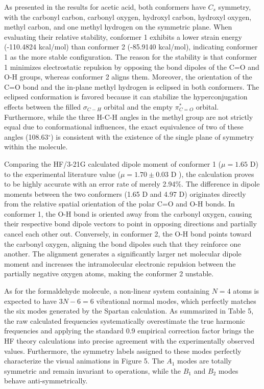 \documentclass[12pt]{article}
\begin{document}
As presented in the results for acetic acid, both conformers have $C_{s}$ symmetry, with the carbonyl carbon, carbonyl oxygen, hydroxyl carbon, hydroxyl oxygen, methyl carbon, and one methyl hydrogen on the symmetric plane. When evaluating their relative stability, conformer 1 exhibits a lower strain energy (-110.4824 kcal/mol) than conformer 2 (-85.9140 kcal/mol), indicating conformer 1 as the more stable configuration. The reason for the stability is that conformer 1 minimizes electrostatic repulsion by opposing the bond dipoles of the C=O and O-H groups, whereas conformer 2 aligns them. Moreover, the orientation of the C=O bond and the in-plane methyl hydrogen is eclipsed in both conformers. The eclipsed conformation is favored because it can stabilize the hyperconjugation effects between the filled $\sigma_{C-H}$ orbital and the empty $\pi_{C=O}^{*}$ orbital. Furthermore, while the three H-C-H angles in the methyl group are not strictly equal due to conformational influences, the exact equivalence of two of these angles (108.63$^\circ$) is consistent with the existence of the single plane of symmetry within the molecule.

Comparing the HF/3-21G calculated dipole moment of conformer 1 ($\mu=1.65$ D) to the experimental literature value ($\mu=1.70\pm0.03$ D \cite{lide2002handbook}), the calculation proves to be highly accurate with an error rate of merely 2.94\%. The difference in dipole moments between the two conformers (1.65 D and 4.97 D) originates directly from the relative spatial orientation of the polar C=O and O-H bonds. In conformer 1, the O-H bond is oriented away from the carbonyl oxygen, causing their respective bond dipole vectors to point in opposing directions and partially cancel each other out. Conversely, in conformer 2, the O-H bond points toward the carbonyl oxygen, aligning the bond dipoles such that they reinforce one another. The alignment generates a significantly larger net molecular dipole moment and increases the intramolecular electronic repulsion between the partially negative oxygen atoms, making the conformer 2 unstable.

As for the formaldehyde molecule, a non-linear system containing $N=4$ atoms is expected to have $3N-6=6$ vibrational normal modes, which perfectly matches the six modes generated by the Spartan calculation. As summarized in Table 5, the raw calculated frequencies systematically overestimate the true harmonic frequencies and applying the standard 0.9 empirical correction factor brings the HF theory calculations into precise agreement with the experimentally observed values. Furthermore, the symmetry labels assigned to these modes perfectly characterize the visual animations in Figure 5. The $A_{1}$ modes are totally symmetric and remain invariant to operations, while the $B_{1}$ and $B_{2}$ modes behave anti-symmetrically.
\end{document}
